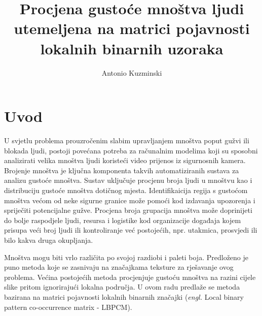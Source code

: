 \documentclass[times, utf8, zavrsni]{fer}
\begin{document}

\title{Procjena gustoće mnoštva ljudi utemeljena na matrici pojavnosti lokalnih binarnih uzoraka}

\author{Antonio Kuzminski}

\maketitle

\izvornik

\zahvala{}

\tableofcontents

\chapter{Uvod}

U svjetlu problema prouzročenim slabim upravljanjem mnoštva poput
gužvi ili blokada ljudi, postoji povećana potreba za računalnim modelima
koji su sposobni analizirati velika mnoštva ljudi koristeći video prijenos
iz sigurnosnih kamera. Brojenje mnoštva je ključna komponenta takvih 
automatiziranih sustava za analizu gustoće mnoštva. Sustav uključuje 
procjenu broja ljudi u mnoštvu kao i distribuciju gustoće mnoštva
dotičnog mjesta. Identifikaicija regija s gustoćom mnoštva većom
od neke sigurne granice može pomoći kod izdavanja upozorenja i spriječiti
potencijalne gužve. Procjena broja grupacija mnoštva može doprinijeti
do bolje raspodjele ljudi, resursa i logistike kod organizacije događaja
kojem prisupa veći broj ljudi ili kontroliranje već postojećih, npr. 
utakmica, prosvjedi ili bilo kakva druga okupljanja.

\bigbreak

Mnoštva mogu biti vrlo različita po svojoj razdiobi i paleti boja. Predloženo 
je puno metoda koje se zasnivaju na značajkama teksture za rješavanje ovog
problema. Većina postojećih metoda procjenjuje gustoću mnoštva na razini
cijele slike pritom ignorirajući lokalna područja. U ovom radu predlaže se
metoda bazirana na matrici pojavnosti lokalnih binarnih značajki
(\textit{engl.} Local binary pattern co-occurrence matrix - LBPCM).

\bigbreak
\end{document}
